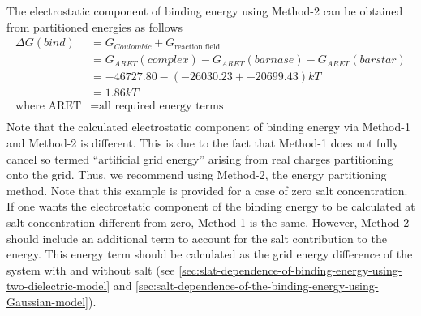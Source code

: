 \documentclass[9pt,tutorial]{livecoms}
\begin{document}
The electrostatic component of binding energy using Method-2 can be obtained from partitioned energies as follows
\begin{equation}
\begin{aligned}
\Delta G(bind) &= G_{Coulombic} + G_{\text{reaction field}}\\
               &= G_{ARET}(complex) - G_{ARET}(barnase) - G_{ARET}(barstar) \\
               &= -46727.80 - (-26030.23 + -20699.43) kT \\
               &= 1.86 kT \\
\text{where ARET} &= \text{all required energy terms} \\
\end{aligned}
\end{equation}
Note that the calculated electrostatic component of binding energy via Method-1 and Method-2 is different. This is due to the fact that Method-1 does not fully cancel so termed ``artificial grid energy'' arising from real charges partitioning onto the grid. Thus, we recommend using Method-2, the energy partitioning method. Note that this example is provided for a case of zero salt concentration. If one wants the electrostatic component of the binding energy to be calculated at salt concentration different from zero, Method-1 is the same. However, Method-2 should include an additional term to account for the salt contribution to the energy. This energy term should be calculated as the grid energy difference of the system with and without salt (see \ref{sec:slat-dependence-of-binding-energy-using-two-dielectric-model} and \ref{sec:salt-dependence-of-the-binding-energy-using-Gaussian-model}).
\end{document}

